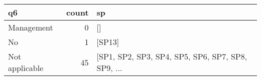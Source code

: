 \begin{tabular}{lrl}
\toprule
             q6 &  count &                                                 sp \\
\midrule
     Management &      0 &                                                 [] \\
             No &      1 &                                             [SP13] \\
 Not applicable &     45 &  [SP1, SP2, SP3, SP4, SP5, SP6, SP7, SP8, SP9, ... \\
\bottomrule
\end{tabular}
